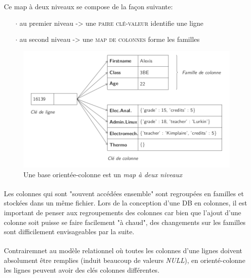 \item{}
{\vrai}
{
Ce map à deux niveaux se compose de la façon suivante:
\begin{itemize}
\item[$\cdot$]au premier niveau -> une \textcolor{ltred}{\textsc{paire clé-valeur}} identifie une ligne
\item[$\cdot$]au second niveau -> une \textcolor{ltred}{\textsc{map de colonnes}} forme les familles
\end{itemize}
\begin{figure}[h!]
\center\includegraphics[scale=.3]{images/colonnes-niveaux}
\caption{Une base orientée-colonne est un \textit{map à deux niveaux} \cite{ref1}}
\end{figure}
\paragraph{}
Les colonnes qui sont "souvent accédées ensemble" sont regroupées en familles et stockées dans un même fichier. Lors de la conception d'une DB en colonnes, il est important de penser aux regroupements des colonnes car bien que l'ajout d'une colonne soit puisse se faire facilement "à chaud", des changements sur les familles sont difficilement envisageables par la suite.
\paragraph{}
Contrairemnet au modèle relationnel où toutes les colonnes d'une lignes doivent absolument être remplies (induit beaucoup de valeurs \textit{NULL}), en orienté-colonne les lignes peuvent avoir des clés colonnes différentes.
}


\item{}
{\vrai}
{}


